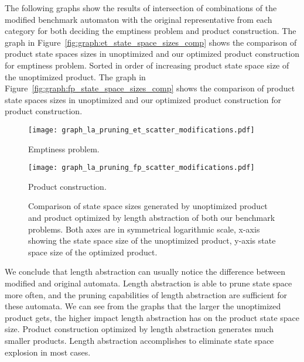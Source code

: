 The following graphs show the results of intersection of combinations of the modified benchmark automaton with the original representative from each category for both deciding the emptiness problem and product construction. The graph in Figure~\ref{fig:graph:et_state_space_sizes_comp} shows the comparison of product state spaces sizes in unoptimized and our optimized product construction for emptiness problem. Sorted in order of increasing product state space size of the unoptimized product. The graph in Figure~\ref{fig:graph:fp_state_space_sizes_comp} shows the comparison of product state spaces sizes in unoptimized and our optimized product construction for product construction.

\begin{figure*}[ht]
    \centering
    \begin{minipage}{0.49\linewidth}
        \centering
        \texttt{[image: graph\_la\_pruning\_et\_scatter\_modifications.pdf]}
        \caption{Emptiness problem.}
        \label{fig:graph:et_state_space_sizes_comp}
    \end{minipage}
    \hfill
    \begin{minipage}{0.49\linewidth}
        \centering
        \texttt{[image: graph\_la\_pruning\_fp\_scatter\_modifications.pdf]}
        \caption{Product construction.}
        \label{fig:graph:fp_state_space_sizes_comp}
    \end{minipage}
    \vspace{0.5cm}
    \caption{Comparison of state space sizes generated by unoptimized product and product optimized by length abstraction of both our benchmark problems. Both axes are in symmetrical logarithmic scale, x-axis showing the state space size of the unoptimized product, y-axis state space size of the optimized product.}
    \label{fig:graph:product_state_space_sizes}
\end{figure*}

We conclude that length abstraction can usually notice the difference between modified and original automata. Length abstraction is able to prune state space more often, and the pruning capabilities of length abstraction are sufficient for these automata. We can see from the graphs that the larger the unoptimized product gets, the higher impact length abstraction has on the product state space size. Product construction optimized by length abstraction generates much smaller products. Length abstraction accomplishes to eliminate state space explosion in most cases.

